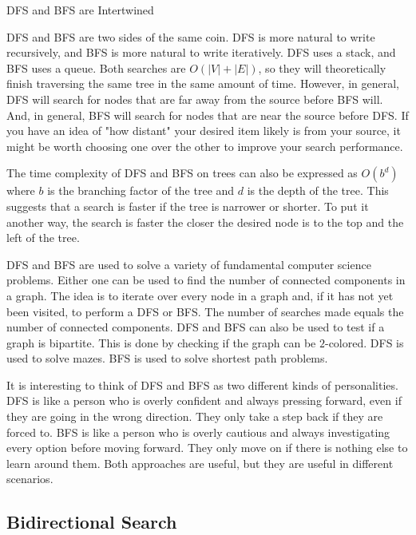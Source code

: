 \begin{bluebox}{DFS and BFS are Intertwined}
    
    DFS and BFS are two sides of the same coin. DFS is more natural to write recursively, and BFS is more natural to write iteratively. DFS uses a stack, and BFS uses a queue. Both searches are $O(|V|+|E|)$, so they will theoretically finish traversing the same tree in the same amount of time. However, in general, DFS will search for nodes that are far away from the source before BFS will. And, in general, BFS will search for nodes that are near the source before DFS. If you have an idea of "how distant" your desired item likely is from your source, it might be worth choosing one over the other to improve your search performance.
    
    The time complexity of DFS and BFS on trees can also be expressed as $O(b^d)$ where $b$ is the branching factor of the tree and $d$ is the depth of the tree. This suggests that a search is faster if the tree is narrower or shorter. To put it another way, the search is faster the closer the desired node is to the top and the left of the tree.
    
    DFS and BFS are used to solve a variety of fundamental computer science problems. Either one can be used to find the number of connected components in a graph. The idea is to iterate over every node in a graph and, if it has not yet been visited, to perform a DFS or BFS. The number of searches made equals the number of connected components. DFS and BFS can also be used to test if a graph is bipartite. This is done by checking if the graph can be $2$-colored. DFS is used to solve mazes. BFS is used to solve shortest path problems.
    
    It is interesting to think of DFS and BFS as two different kinds of personalities. DFS is like a person who is overly confident and always pressing forward, even if they are going in the wrong direction. They only take a step back if they are forced to. BFS is like a person who is overly cautious and always investigating every option before moving forward. They only move on if there is nothing else to learn around them. Both approaches are useful, but they are useful in different scenarios.

\end{bluebox}

\subsection{Bidirectional Search}

